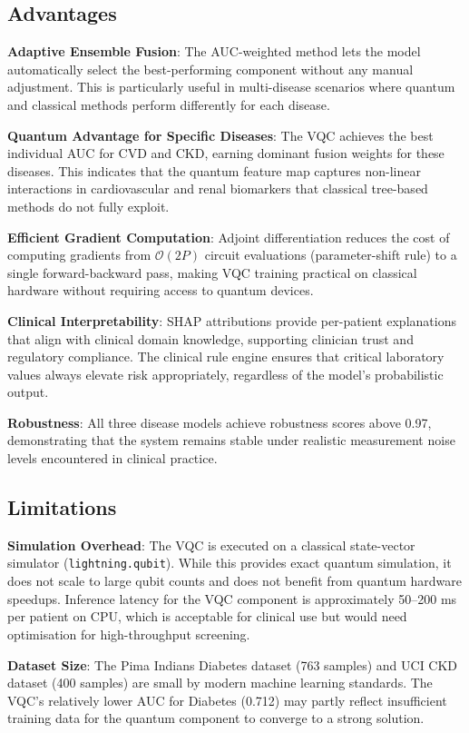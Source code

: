 ﻿\documentclass[conference]{IEEEtran}
\begin{document}
\subsection{Advantages}

\textbf{Adaptive Ensemble Fusion}: The AUC-weighted method lets the model automatically
select the best-performing component without any manual adjustment. This is particularly
useful in multi-disease scenarios where quantum and classical methods perform differently
for each disease.

\textbf{Quantum Advantage for Specific Diseases}: The VQC achieves the best individual
AUC for CVD and CKD, earning dominant fusion weights for these diseases. This indicates
that the quantum feature map captures non-linear interactions in cardiovascular and renal
biomarkers that classical tree-based methods do not fully exploit.

\textbf{Efficient Gradient Computation}: Adjoint differentiation reduces the cost of
computing gradients from $\mathcal{O}(2P)$ circuit evaluations (parameter-shift rule) to
a single forward-backward pass, making VQC training practical on classical hardware
without requiring access to quantum devices.

\textbf{Clinical Interpretability}: SHAP attributions provide per-patient explanations
that align with clinical domain knowledge, supporting clinician trust and regulatory
compliance. The clinical rule engine ensures that critical laboratory values always
elevate risk appropriately, regardless of the model's probabilistic output.

\textbf{Robustness}: All three disease models achieve robustness scores above 0.97,
demonstrating that the system remains stable under realistic measurement noise levels
encountered in clinical practice.

\subsection{Limitations}

\textbf{Simulation Overhead}: The VQC is executed on a classical state-vector simulator
(\texttt{lightning.qubit}). While this provides exact quantum simulation, it does not
scale to large qubit counts and does not benefit from quantum hardware speedups. Inference
latency for the VQC component is approximately 50--200 ms per patient on CPU, which is
acceptable for clinical use but would need optimisation for high-throughput screening.

\textbf{Dataset Size}: The Pima Indians Diabetes dataset (763 samples) and UCI CKD
dataset (400 samples) are small by modern machine learning standards. The VQC's
relatively lower AUC for Diabetes (0.712) may partly reflect insufficient training data
for the quantum component to converge to a strong solution.
\end{document}
